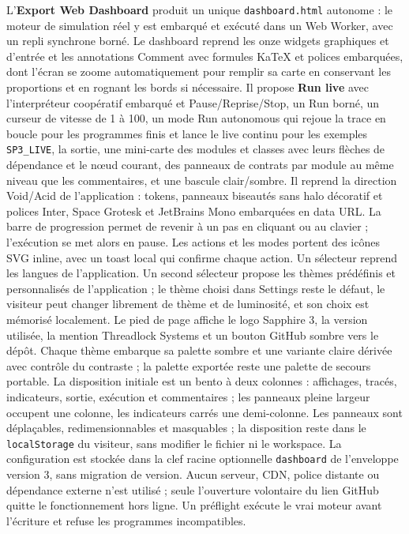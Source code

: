 \documentclass[11pt,a4paper]{article}
\newcommand{\code}[1]{\texttt{#1}}
\begin{document}
L'\textbf{Export Web Dashboard} produit un unique \code{dashboard.html} autonome :
le moteur de simulation réel y est embarqué et exécuté dans un Web Worker, avec un
repli synchrone borné. Le dashboard reprend les onze widgets graphiques et d'entrée et les annotations Comment avec formules KaTeX et polices embarquées, dont l'écran
se zoome automatiquement pour remplir sa carte en conservant les proportions
et en rognant les bords si nécessaire. Il propose \textbf{Run live} avec
l'interpréteur coopératif embarqué et Pause/Reprise/Stop, un Run borné,
un curseur de vitesse de 1 à 100, un mode Run autonomous qui rejoue la trace
en boucle pour les programmes finis et lance le live continu pour les exemples
\code{SP3\_LIVE}, la sortie,
une mini-carte des modules et classes avec leurs flèches de dépendance et le nœud courant,
des panneaux de contrats par module au même niveau que les commentaires,
et une bascule clair/sombre. Il reprend la direction
Void/Acid de l'application : tokens, panneaux biseautés sans halo décoratif et polices Inter, Space Grotesk
et JetBrains Mono embarquées en data URL. La barre de progression permet de revenir à
un pas en cliquant ou au clavier ; l'exécution se met alors en pause. Les actions et
les modes portent des icônes SVG inline, avec un toast local qui confirme chaque action. Un sélecteur reprend les langues de l'application. Un second sélecteur propose les thèmes prédéfinis et personnalisés de l'application ; le thème choisi dans Settings reste le défaut, le visiteur peut changer librement de thème et de luminosité, et son choix est mémorisé localement. Le pied de page affiche le logo Sapphire 3,
la version utilisée, la mention Threadlock Systems et un bouton GitHub sombre vers le dépôt.
Chaque thème embarque sa palette sombre et une
variante claire dérivée avec contrôle du contraste ; la palette exportée reste une palette de secours portable. La disposition initiale est un bento
à deux colonnes : affichages, tracés, indicateurs, sortie, exécution et commentaires ; les
panneaux pleine largeur occupent une colonne, les indicateurs carrés une demi-colonne. Les
panneaux sont déplaçables, redimensionnables et masquables ; la disposition reste dans le
\code{localStorage} du visiteur, sans modifier le fichier ni le workspace. La configuration est stockée dans la
clef racine optionnelle \code{dashboard} de l'enveloppe version 3, sans migration de
version. Aucun serveur, CDN, police distante ou dépendance externe n'est utilisé ;
seule l'ouverture volontaire du lien GitHub quitte le fonctionnement hors ligne. Un
préflight exécute le vrai moteur avant l'écriture et refuse les programmes incompatibles.
\end{document}
